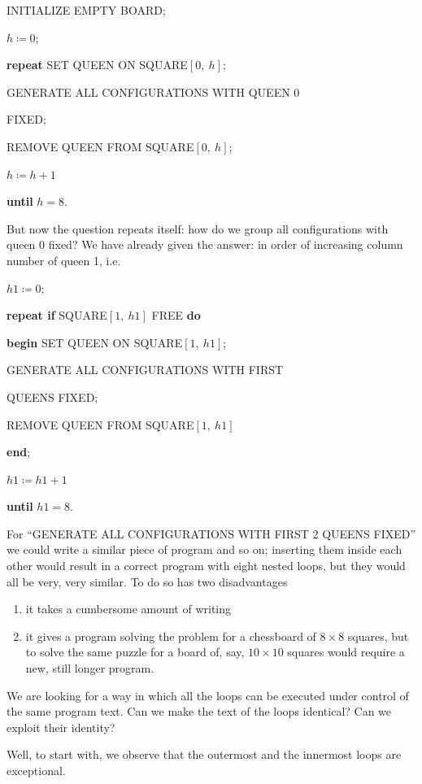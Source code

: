 \documentclass[twoside,11pt]{book}
\begin{document}
INITIALIZE EMPTY BOARD;

$h \coloneq 0$;

\textbf{repeat} SET QUEEN ON SQUARE$[0,\ h]$;

\quad GENERATE ALL CONFIGURATIONS WITH QUEEN 0

\quad\quad FIXED;

\quad REMOVE QUEEN FROM SQUARE$[0,\ h]$;

\quad $h \coloneq h + 1$

\textbf{until} $h = 8$.

But now the question repeats itself: how do we group all configurations with queen 0 fixed? We have already given the answer: in order of increasing column number of queen 1, i.e.

$h1 \coloneq 0$;

\textbf{repeat if} SQUARE$[1,\ h1]$ FREE \textbf{do}

\quad \textbf{begin} SET QUEEN ON SQUARE$[1,\ h1]$;

\quad \quad GENERATE ALL CONFIGURATIONS WITH FIRST

\quad \quad {} QUEENS FIXED;

\quad \quad REMOVE QUEEN FROM SQUARE$[1,\ h1]$

\quad \textbf{end};

\quad $h1 \coloneq h1 + 1$

\textbf{until} $h1 = 8$.

For ``GENERATE ALL CONFIGURATIONS WITH FIRST 2 QUEENS FIXED'' we could write a similar piece of program and so on; inserting
them inside each other would result in a correct program with eight nested loops, but they would all be very, very similar. To do so has two disadvantages

\begin{enumerate}[wide, nosep, label=(\arabic*)]
	\item it takes a cumbersome amount of writing
	\item it gives a program solving the problem for a chessboard of $8\times 8$ squares, but to solve the same puzzle for a board of, say, $10\times 10$ squares would require a new, still longer program.
\end{enumerate}

We are looking for a way in which all the loops can be executed under control of the same program text. Can we make the text of the loops identical? Can we exploit their identity?

Well, to start with, we observe that the outermost and the innermost loops are exceptional.
\end{document}
